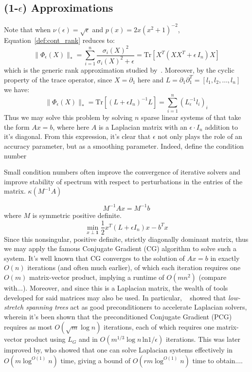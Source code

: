 \documentclass[10pt]{article}
\numberwithin{equation}{section}
\newcommand{\+}{%
	\raisebox{0.18ex}{\scaleobj{0.55}{+}}
}
\theoremstyle{definition}
\begin{document}
\subsection{(1-$\epsilon$) Approximations}
Note that when $\nu(\epsilon) = \sqrt{\epsilon}$ and $p(x) = 2x (x^2 + 1)^{-2}$, Equation~\eqref{def:cont_rank} reduces to: 
\begin{equation*}
	\lVert \Phi_\epsilon(X) \rVert_\ast = \sum\limits_{i = 1}^n \frac{\sigma_i(X)^2}{\sigma_i(X)^2 + \epsilon} = \mathrm{Tr}\left[X^T (X X^T + \epsilon \, I_n) X \right] 
\end{equation*}
which is the generic rank approximation studied by~\cite{}. Moreover, by the cyclic property of the trace operator, since $X = \partial_1$ here and $L = \partial_1 \partial_1^T = [l_1, l_2, \dots, l_n]$ we have: 
\begin{equation*}
	\lVert \Phi_\epsilon(X) \rVert_\ast = \mathrm{Tr}[(L + \epsilon I_n)^{-1} L] = \sum\limits_{i=1}^n (L_\epsilon^{-1} l_i)_i
\end{equation*}
Thus we may solve this problem by solving $n$ sparse linear systems of that take the form $Ax = b$, where here $A$ is a Laplacian matrix with an $\epsilon \cdot I_n$ addition to it's diagonal. 
From this expression, it's clear that $\epsilon$ not only plays the role of an accuracy parameter, but as a smoothing parameter. Indeed, define the condition number

Small condition numbers often improve the convergence of iterative solvers and improve stability of spectrum with respect to perturbations in the entries of the matrix. 
$\kappa(M^{-1} A)$

$$
M^{-1} A x = M^{-1}b 
$$
where $M$ is symmetric positive definite. 
\begin{equation}
	\min_{x \perp \mathbf{1} } \frac{1}{2} x^T (L + \epsilon I_n) x - b^T x
\end{equation}
Since this nonsingular, positive definite, strictly diagonally dominant matrix, thus we may apply the famous Conjugate Gradient (CG) algorithm to solve such a system. It's well known that CG converges to the solution of $A x = b$ in exactly $O(n)$ iterations (and often much earlier), of which each iteration requires one $O(m)$ matrix-vector product, implying a runtime of $O(mn^2)$ (compare with...).  
Moreover, and since this is a Laplacian matrix, the wealth of tools developed for said matrices may also be used.
In particular, ~\cite{} showed that \emph{low-stretch spanning trees} act as good preconditioners to accelerate Laplacian solvers, wherein it's been shown that the preconditioned Conjugate Gradient (PCG) requires as most $O(\sqrt{m} \log n)$ iterations, each of which requires one matrix-vector product using $L_G$ and in $O(m^{1/3} \log n \, \mathrm{ln} 1/\epsilon)$ iterations. 
This was later improved by, who showed that one can solve Laplacian systems effectively in $O(m \log^{O(1)} n)$ time, giving a bound of $O(r m \log^{O(1)} n)$ time to obtain.... 
\end{document}
